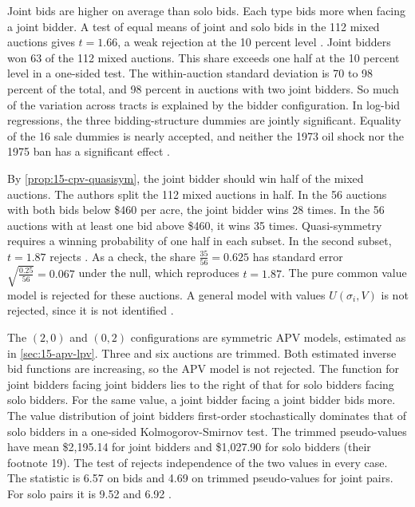 Joint bids are higher on average than solo bids. Each type bids more when facing a joint bidder. A test of
equal means of joint and solo bids in the 112 mixed auctions gives $t=1.66$, a weak rejection at the 10
percent level \citep[p.~190]{CampoPerrigneVuong2003}. Joint bidders won 63 of the 112 mixed auctions. This
share exceeds one half at the 10 percent level in a one-sided test. The within-auction standard deviation is
70 to 98 percent of the total, and 98 percent in auctions with two joint bidders. So much of the variation
across tracts is explained by the bidder configuration. In log-bid regressions, the three bidding-structure
dummies are jointly significant. Equality of the 16 sale dummies is nearly accepted, and neither the 1973
oil shock nor the 1975 ban has a significant effect \citep[p.~191]{CampoPerrigneVuong2003}.

 By \cref{prop:15-cpv-quasisym}, the joint bidder should win half of
the mixed auctions. The authors split the 112 mixed auctions in half. In the 56 auctions with both bids below
\$460 per acre, the joint bidder wins 28 times. In the 56 auctions with at least one bid above \$460, it wins
35 times. Quasi-symmetry requires a winning probability of one half in each subset. In the second subset,
$t=1.87$ rejects \citep[p.~195]{CampoPerrigneVuong2003}. As a check, the share $\frac{35}{56}=0.625$ has
standard error $\sqrt{\frac{0.25}{56}}=0.067$ under the null, which reproduces $t=1.87$. The pure common
value model is rejected for these auctions. A general model with values $U(\sigma_i,V)$ is not rejected, since
it is not identified \citep{LaffontVuong1996}.

 The $(2,0)$ and $(0,2)$ configurations are symmetric APV models, estimated as
in \cref{sec:15-apv-lpv}. Three and six auctions are trimmed. Both estimated inverse bid functions are
increasing, so the APV model is not rejected. The function for joint bidders facing joint bidders lies to the
right of that for solo bidders facing solo bidders. For the same value, a joint bidder facing a joint bidder
bids more. The value distribution of joint bidders first-order stochastically dominates that of solo bidders
in a one-sided Kolmogorov-Smirnov test. The trimmed pseudo-values have mean \$2,195.14 for joint bidders and
\$1,027.90 for solo bidders (their footnote 19). The test of \citet{BlumKieferRosenblatt1961} rejects
independence of the two values in every case. The statistic is 6.57 on bids and 4.69 on trimmed pseudo-values
for joint pairs. For solo pairs it is 9.52 and 6.92 \citep[p.~197]{CampoPerrigneVuong2003}.

